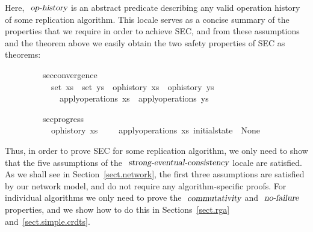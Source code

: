 \vspace{0.35em}
Here, $\isa{op-history}$ is an abstract predicate describing any valid operation history of some replication algorithm.
This locale serves as a concise summary of the properties that we require in order to achieve SEC, and from these assumptions and the theorem above we easily obtain the two safety properties of SEC as theorems:
\vspace{0.35em}
\begin{isabellebody}
\ \ \ \ \ \ \ \ \ sec{\isacharunderscore}convergence{\isacharcolon}\isanewline
\ \ \ \ \ \ \ \ \ \ \ {\isachardoublequoteopen}set\ xs\ {\isacharequal}\ set\ ys{\isachardoublequoteclose}\ \ {\isachardoublequoteopen}op{\isacharunderscore}history\ xs{\isachardoublequoteclose}\ \ {\isachardoublequoteopen}op{\isacharunderscore}history\ ys{\isachardoublequoteclose}\isanewline
\ \ \ \ \ \ \ \ \ \ \ \ \ {\isachardoublequoteopen}apply{\isacharunderscore}operations\ xs\ {\isacharequal}\ apply{\isacharunderscore}operations\ ys{\isachardoublequoteclose}
\end{isabellebody}
\vspace{0.35em}
\begin{isabellebody}
\ \ \ \ \ \ \ \ \ sec{\isacharunderscore}progress{\isacharcolon}\isanewline
\ \ \ \ \ \ \ \ \ \ \ {\isachardoublequoteopen}op{\isacharunderscore}history\ xs{\isachardoublequoteclose}\ \ \ \ \ {\isachardoublequoteopen}apply{\isacharunderscore}operations\ xs\ initial{\isacharunderscore}state\ {\isasymnoteq}\ None{\isachardoublequoteclose}
\end{isabellebody}
\vspace{0.35em}
Thus, in order to prove SEC for some replication algorithm, we only need to show that the five assumptions of the $\isa{strong-eventual-consistency}$ locale are satisfied.
As we shall see in Section~\ref{sect.network}, the first three assumptions are satisfied by our network model, and do not require any algorithm-specific proofs.
For individual algorithms we only need to prove the $\isa{commutativity}$ and $\isa{no-failure}$ properties, and we show how to do this in Sections~\ref{sect.rga} and~\ref{sect.simple.crdts}.
